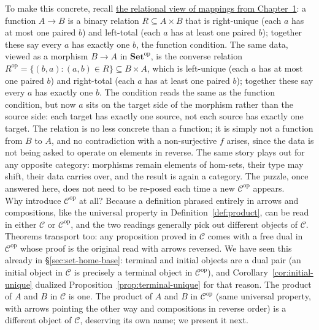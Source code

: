 \noindent To make this concrete, recall
\hyperref[note:mapping-as-relation]{the relational view of
mappings from Chapter~1}: a function $A \to B$ is a binary
relation $R \subseteq A \times B$ that is right-unique (each $a$
has at most one paired $b$) and left-total (each $a$ has at
least one paired $b$); together these say every $a$ has exactly
one $b$, the function condition. The same data, viewed as a
morphism $B \to A$ in $\mathbf{Set}^{\mathrm{op}}$, is the
converse relation
$R^{\mathrm{op}} = \{(b, a) : (a, b) \in R\} \subseteq B \times A$,
which is left-unique (each $a$ has at most one paired $b$) and
right-total (each $a$ has at least one paired $b$); together
these say every $a$ has exactly one $b$. The condition reads
the same as the function condition, but now $a$ sits on the
target side of the morphism rather than the source side: each
target has exactly one source, not each source has exactly one
target. The relation is no less concrete than a function; it is
simply not a function from $B$ to $A$, and no contradiction with
a non-surjective $f$ arises, since the data is not being asked
to operate on elements in reverse. The same story plays out for
any opposite category: morphisms remain elements of hom-sets,
their type may shift, their data carries over, and the result
is again a category. The puzzle, once answered here, does not
need to be re-posed each time a new $\mathcal{C}^{\mathrm{op}}$
appears.\\

\noindent Why introduce $\mathcal{C}^{\mathrm{op}}$ at all?
Because a definition phrased entirely in arrows and compositions,
like the universal property in Definition~\ref{def:product}, can
be read in either $\mathcal{C}$ or $\mathcal{C}^{\mathrm{op}}$,
and the two readings generally pick out different objects of
$\mathcal{C}$. Theorems transport too: any proposition proved in
$\mathcal{C}$ comes with a free dual in $\mathcal{C}^{\mathrm{op}}$
whose proof is the original read with arrows reversed. We have
seen this already in \S\ref{sec:set-home-base}: terminal and
initial objects are a dual pair (an initial object in
$\mathcal{C}$ is precisely a terminal object in
$\mathcal{C}^{\mathrm{op}}$), and Corollary~\ref{cor:initial-unique}
dualized Proposition~\ref{prop:terminal-unique} for that reason.
The product of $A$ and $B$ in $\mathcal{C}$ is one. The product of $A$ and $B$ in $\mathcal{C}^{\mathrm{op}}$
(same universal property, with arrows pointing the other way and
compositions in reverse order) is a different object of
$\mathcal{C}$, deserving its own name; we present it next.
\newpage

